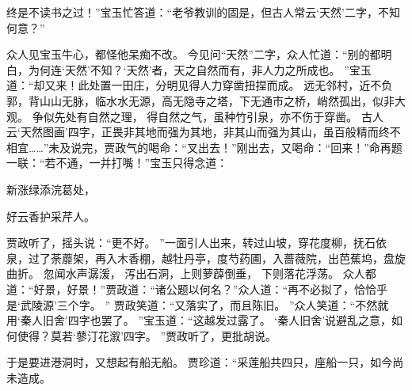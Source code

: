 终是不读书之过！”宝玉忙答道：“老爷教训的固是，但古人常云‘天然’二字，不知何意？”\par
众人见宝玉牛心，都怪他呆痴不改。
今见问“天然”二字，众人忙道：“别的都明白，为何连‘天然’不知？‘天然’者，天之自然而有，非人力之所成也。
”宝玉道：“却又来！此处置一田庄，分明见得人力穿凿扭捏而成。
远无邻村，近不负郭，背山山无脉，临水水无源，高无隐寺之塔，下无通市之桥，峭然孤出，似非大观。
争似先处有自然之理，
得自然之气，虽种竹引泉，亦不伤于穿凿。
古人云‘天然图画’四字，正畏非其地而强为其地，非其山而强为其山，虽百般精而终不相宜……”未及说完，贾政气的喝命：“叉出去！”刚出去，又喝命：“回来！”命再题一联：“若不通，一并打嘴！”宝玉只得念道：\par
\hop
新涨绿添浣葛处，\par
好云香护采芹人。
\par
{}\par
\hop
贾政听了，摇头说：“更不好。
”一面引人出来，转过山坡，穿花度柳，抚石依泉，过了荼蘼架，再入木香棚，越牡丹亭，度芍药圃，入蔷薇院，出芭蕉坞，盘旋曲折。
忽闻水声潺湲，
泻出石洞，上则萝薜倒垂，
下则落花浮荡。
众人都道：“好景，好景！”贾政道：“诸公题以何名？”众人道：“再不必拟了，恰恰乎是‘武陵源’三个字。
”
贾政笑道：“又落实了，而且陈旧。
”众人笑道：“不然就用‘秦人旧舍’四字也罢了。
”宝玉道：“这越发过露了。
‘秦人旧舍’说避乱之意，如何使得？莫若‘蓼汀花溆’四字。
”贾政听了，更批胡说。
\par
于是要进港洞时，又想起有船无船。
贾珍道：“采莲船共四只，座船一只，如今尚未造成。
